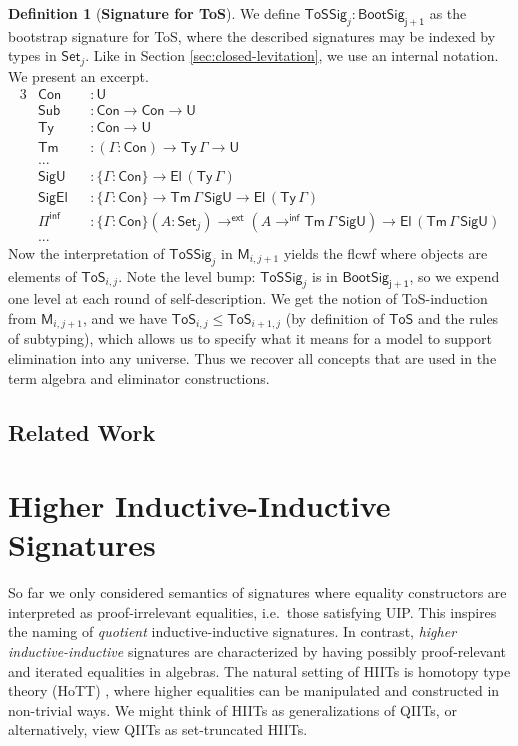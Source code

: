 \documentclass[12pt,a4paper,twoside,openany]{book}
\theoremstyle{remark}
\theoremstyle{definition}
\newtheorem{mydefinition}{Definition}
\theoremstyle{theorem}
\newcommand{\ms}[1]{\mathsf{#1}}
\newcommand{\bs}[1]{\boldsymbol{#1}}
\newcommand{\Con}{\mathsf{Con}}
\newcommand{\Sub}{\mathsf{Sub}}
\newcommand{\Tm}{\mathsf{Tm}}
\newcommand{\Ty}{\mathsf{Ty}}
\newcommand{\U}{\mathsf{U}}
\newcommand{\El}{\mathsf{El}}
\newcommand{\Set}{\mathsf{Set}}
\newcommand{\ToS}{\mathsf{ToS}}
\newcommand{\toe}{\to^{\ms{ext}}}
\newcommand{\Piinf}{\Pi^{\mathsf{inf}}}
\newcommand{\ToSSig}{\mathsf{ToSSig}}
\newcommand{\toinf}{\to^{\ms{inf}}}
\newcommand{\bM}{\bs{\mathsf{M}}}
\begin{document}
\begin{mydefinition}[\textbf{Signature for ToS}]
We define $\ToSSig_j : \ms{BootSig_{j+1}}$ as the bootstrap signature for ToS, where the
described signatures may be indexed by types in $\Set_j$. Like in Section
\ref{sec:closed-levitation}, we use an internal notation. We present an excerpt.
\begingroup
\allowdisplaybreaks
\begin{alignat*}{3}
  & \Con       &&: \U\\
  & \Sub       &&: \Con \to \Con \to \U\\
  & \Ty        &&: \Con \to \U\\
  & \Tm        &&: (\Gamma : \Con) \to \Ty\,\Gamma \to \U\\
  & ...        &&\\
  & \ms{SigU}  &&: \{\Gamma : \Con\} \to \El\,(\Ty\,\Gamma)\\
  & \ms{SigEl} &&: \{\Gamma : \Con\} \to \Tm\,\Gamma\,\ms{SigU} \to \El\,(\Ty\,\Gamma)\\
  & \Piinf     &&: \{\Gamma : \Con\}(A : \Set_j) \toe (A \toinf \Tm\,\Gamma\,\ms{SigU}) \to \El\,(\Tm\,\Gamma\,\ms{SigU})\\
  & ...        &&
\end{alignat*}
Now the interpretation of $\ToSSig_j$ in $\bM_{i,j+1}$ yields the flcwf where
objects are elements of $\ToS_{i,j}$. Note the level bump: $\ToSSig_j$ is in
$\ms{BootSig_{j+1}}$, so we expend one level at each round of self-description.
We get the notion of ToS-induction from $\bM_{i,j+1}$, and we have $\ToS_{i,j}
\leq \ToS_{i+1,j}$ (by definition of $\ToS$ and the rules of subtyping), which
allows us to specify what it means for a model to support elimination into any
universe. Thus we recover all concepts that are used in the term algebra and
eliminator constructions.
\end{mydefinition}
\endgroup

\section{Related Work}
\label{sec:iqii-related-work}

\chapter{Higher Inductive-Inductive Signatures}
\label{chap:hiit}

So far we only considered semantics of signatures where equality constructors
are interpreted as proof-irrelevant equalities, i.e.\ those satisfying UIP. This
inspires the naming of \emph{quotient} inductive-inductive signatures. In
contrast, \emph{higher inductive-inductive} signatures are characterized by
having possibly proof-relevant and iterated equalities in algebras. The natural
setting of HIITs is homotopy type theory (HoTT) \cite{hottbook}, where higher
equalities can be manipulated and constructed in non-trivial ways. We might
think of HIITs as generalizations of QIITs, or alternatively, view QIITs as
set-truncated HIITs.
\end{document}
